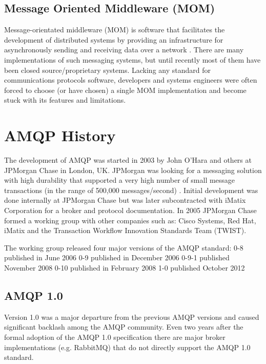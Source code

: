 \documentclass{thesis}
\begin{document}
\subsection{Message Oriented Middleware (MOM)}
Message-orientated middleware (MOM) is software that facilitates the development of distributed systems by providing an infrastructure for asynchronously sending and receiving data over a network \cite{todo}.   There are many implementations of such messaging systems, but until recently most of them have been closed source/proprietary systems.  Lacking any standard for communications protocols software, developers and systems engineers were often forced to choose (or have chosen) a single MOM implementation and become stuck with its features and limitations.  


\section{AMQP History}
The development of AMQP was started in 2003 by John O'Hara and others at JPMorgan Chase in London, UK.  JPMorgan was looking for a messaging solution with high durability that supported a very high number of small message transactions (in the range of 500,000 messages/second) \cite{todo}.  Initial development was done internally at JPMorgan Chase but was later subcontracted with iMatix Corporation for a broker and protocol documentation.  In 2005 JPMorgan Chase formed a working group with other companies such as: Cisco Systems, Red Hat, iMatix and the Transaction Workflow Innovation Standards Team (TWIST).

The working group released four major versions of the AMQP standard:
0-8 published in June 2006
0-9 published in December 2006
0-9-1 published November 2008
0-10 published in February 2008
1-0 published October 2012

\subsection{AMQP 1.0}

Version 1.0 was a major departure from the previous AMQP versions and caused significant backlash among the AMQP community.  Even two years after the formal adoption of the AMQP 1.0 specification there are major broker implementations (e.g. RabbitMQ) that do not directly support the AMQP 1.0 standard.  
\end{document}
